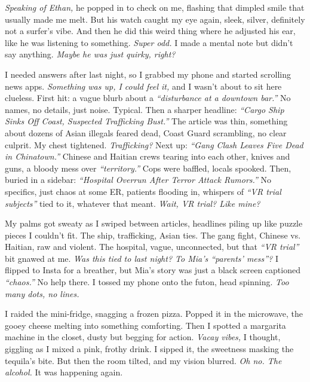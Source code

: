 \documentclass[12pt]{article}
\begin{document}
{\textit{Speaking of \textnormal{Ethan},} he popped in to check on me, flashing that dimpled smile that usually made me melt. But his watch caught my eye again, sleek, silver, definitely not a surfer’s vibe. And then he did this weird thing where he adjusted his ear, like he was listening to something. \textit{Super odd.} I made a mental note but didn’t say anything. \textit{Maybe he was just quirky, right?}

I needed answers after last night, so I grabbed my phone and started scrolling news apps. \textit{Something was up, I could feel it,} and I wasn’t about to sit here clueless. First hit: a vague blurb about a \textit{“disturbance at a downtown bar.”} No names, no details, just noise. Typical. Then a sharper headline: \textit{“Cargo Ship Sinks Off Coast, Suspected Trafficking Bust.”} The article was thin, something about dozens of Asian illegals feared dead, Coast Guard scrambling, no clear culprit. My chest tightened. \textit{Trafficking?} Next up: \textit{“Gang Clash Leaves Five Dead in Chinatown.”} Chinese and Haitian crews tearing into each other, knives and guns, a bloody mess over \textit{“territory.”} Cops were baffled, locals spooked. Then, buried in a sidebar: \textit{“Hospital Overrun After Terror Attack Rumors.”} No specifics, just chaos at some ER, patients flooding in, whispers of \textit{“VR trial subjects”} tied to it, whatever that meant. \textit{Wait, VR trial? Like mine?}

My palms got sweaty as I swiped between articles, headlines piling up like puzzle pieces I couldn’t fit. The ship, trafficking, Asian ties. The gang fight, Chinese vs. Haitian, raw and violent. The hospital, vague, unconnected, but that \textit{“VR trial”} bit gnawed at me. \textit{Was this tied to last night? To \textnormal{Mia}’s “parents’ mess”?} I flipped to Insta for a breather, but \textnormal{Mia}’s story was just a black screen captioned \textit{“chaos.”} No help there. I tossed my phone onto the futon, head spinning. \textit{Too many dots, no lines.}

I raided the mini-fridge, snagging a frozen pizza. Popped it in the microwave, the gooey cheese melting into something comforting. Then I spotted a margarita machine in the closet, dusty but begging for action. \textit{Vacay vibes,} I thought, giggling as I mixed a pink, frothy drink. I sipped it, the sweetness masking the tequila’s bite. But then the room tilted, and my vision blurred. \textit{Oh no. The alcohol.} It was happening again.

}
\end{document}
